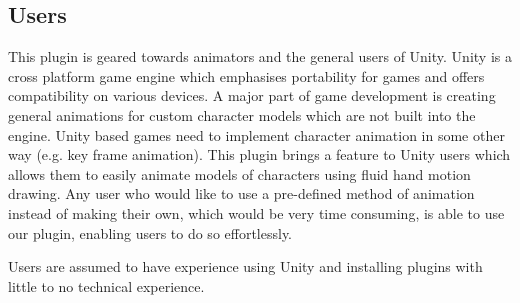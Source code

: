 \subsection{Users}
This plugin is geared towards animators and the general users of Unity. Unity is a cross platform game engine which emphasises portability for games and offers compatibility on various devices. A major part of game development is creating general animations for custom character models which are not built into the engine. Unity based games need to implement character animation in some other way (e.g. key frame animation). This plugin brings a feature to Unity users which allows them to easily animate models of characters using fluid hand motion drawing. Any user who would like to use a pre-defined method of animation instead of making their own, which would be very time consuming, is able to use our plugin, enabling users to do so effortlessly.

Users are assumed to have experience using Unity and installing plugins with little to no technical experience.
